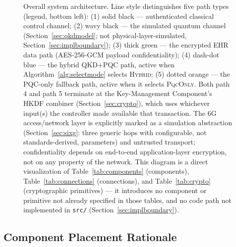 \documentclass[journal]{IEEEtran}
\begin{document}
\begin{figure}[t]
\caption{Overall system architecture. Line style distinguishes five path types (legend, bottom left): (1) solid black --- authenticated classical control channel; (2) wavy black --- the simulated quantum channel (Section~\ref{sec:qkdmodel}; not physical-layer-simulated, Section~\ref{sec:implboundary}); (3) thick green --- the encrypted EHR data path (AES-256-GCM payload confidentiality); (4) dash-dot blue --- the hybrid QKD+PQC path, active when Algorithm~\ref{alg:selectmode} selects \textsc{Hybrid}; (5) dotted orange --- the PQC-only fallback path, active when it selects \textsc{PqcOnly}. Both path 4 and path 5 terminate at the Key-Management Component's HKDF combiner (Section~\ref{sec:crypto}), which uses whichever input(s) the controller made available that transaction. The 6G access/network layer is explicitly marked as a simulation abstraction (Section~\ref{sec:sixg}: three generic hops with configurable, not standards-derived, parameters) and untrusted transport; confidentiality depends on end-to-end application-layer encryption, not on any property of the network. This diagram is a direct visualization of Table~\ref{tab:components} (components), Table~\ref{tab:connections} (connections), and Table~\ref{tab:crypto} (cryptographic primitives) --- it introduces no component or primitive not already specified in those tables, and no code path not implemented in \texttt{src/} (Section~\ref{sec:implboundary}).}
\label{fig:architecture}
\end{figure}

\subsection{Component Placement Rationale}
\end{document}
